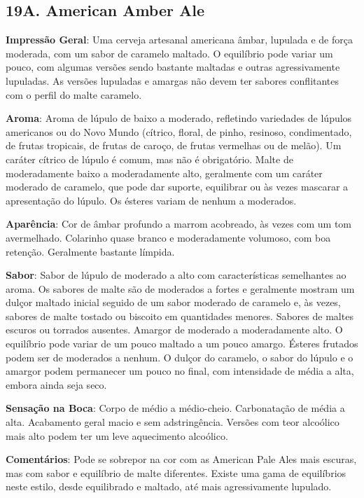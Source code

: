 \subsection*{19A. American Amber Ale}
\textbf{Impressão Geral}: Uma cerveja artesanal americana âmbar, lupulada e de força moderada, com um sabor de caramelo maltado. O equilíbrio pode variar um pouco, com algumas versões sendo bastante maltadas e outras agressivamente lupuladas. As versões lupuladas e amargas não devem ter sabores conflitantes com o perfil do malte caramelo.

\textbf{Aroma}: Aroma de lúpulo de baixo a moderado, refletindo variedades de lúpulos americanos ou do Novo Mundo (cítrico, floral, de pinho, resinoso, condimentado, de frutas tropicais, de frutas de caroço, de frutas vermelhas ou de melão). Um caráter cítrico de lúpulo é comum, mas não é obrigatório. Malte de moderadamente baixo a moderadamente alto, geralmente com um caráter moderado de caramelo, que pode dar suporte, equilibrar ou às vezes mascarar a apresentação do lúpulo. Os ésteres variam de nenhum a moderados.

\textbf{Aparência}: Cor de âmbar profundo a marrom acobreado, às vezes com um tom avermelhado. Colarinho quase branco e moderadamente volumoso, com boa retenção. Geralmente bastante límpida.

\textbf{Sabor}: Sabor de lúpulo de moderado a alto com características semelhantes ao aroma. Os sabores de malte são de moderados a fortes e geralmente mostram um dulçor maltado inicial seguido de um sabor moderado de caramelo e, às vezes, sabores de malte tostado ou biscoito em quantidades menores. Sabores de maltes escuros ou torrados ausentes. Amargor de moderado a moderadamente alto. O equilíbrio pode variar de um pouco maltado a um pouco amargo. Ésteres frutados podem ser de moderados a nenhum. O dulçor do caramelo, o sabor do lúpulo e o amargor podem permanecer um pouco no final, com intensidade de média a alta, embora ainda seja seco.

\textbf{Sensação na Boca}: Corpo de médio a médio-cheio. Carbonatação de média a alta. Acabamento geral macio e sem adstringência. Versões com teor alcoólico mais alto podem ter um leve aquecimento alcoólico.

\textbf{Comentários}: Pode se sobrepor na cor com as American Pale Ales mais escuras, mas com sabor e equilíbrio de malte diferentes. Existe uma gama de equilíbrios neste estilo, desde equilibrado e maltado, até mais agressivamente lupulado.

